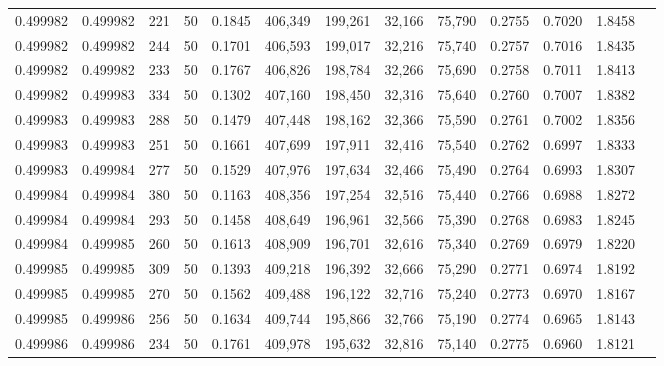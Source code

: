 \begin{tabular}{rrrrrrrrrrrrr}
0.499982 & 0.499982 &   221 &  50 &                                     0.1845 & 406,349 & 199,261 &  32,166 &  75,790 & 0.2755 & 0.7020 & 1.8458 \\
0.499982 & 0.499982 &   244 &  50 &                                     0.1701 & 406,593 & 199,017 &  32,216 &  75,740 & 0.2757 & 0.7016 & 1.8435 \\
0.499982 & 0.499982 &   233 &  50 &                                     0.1767 & 406,826 & 198,784 &  32,266 &  75,690 & 0.2758 & 0.7011 & 1.8413 \\
0.499982 & 0.499983 &   334 &  50 &                                     0.1302 & 407,160 & 198,450 &  32,316 &  75,640 & 0.2760 & 0.7007 & 1.8382 \\
0.499983 & 0.499983 &   288 &  50 &                                     0.1479 & 407,448 & 198,162 &  32,366 &  75,590 & 0.2761 & 0.7002 & 1.8356 \\
0.499983 & 0.499983 &   251 &  50 &                                     0.1661 & 407,699 & 197,911 &  32,416 &  75,540 & 0.2762 & 0.6997 & 1.8333 \\
0.499983 & 0.499984 &   277 &  50 &                                     0.1529 & 407,976 & 197,634 &  32,466 &  75,490 & 0.2764 & 0.6993 & 1.8307 \\
0.499984 & 0.499984 &   380 &  50 &                                     0.1163 & 408,356 & 197,254 &  32,516 &  75,440 & 0.2766 & 0.6988 & 1.8272 \\
0.499984 & 0.499984 &   293 &  50 &                                     0.1458 & 408,649 & 196,961 &  32,566 &  75,390 & 0.2768 & 0.6983 & 1.8245 \\
0.499984 & 0.499985 &   260 &  50 &                                     0.1613 & 408,909 & 196,701 &  32,616 &  75,340 & 0.2769 & 0.6979 & 1.8220 \\
0.499985 & 0.499985 &   309 &  50 &                                     0.1393 & 409,218 & 196,392 &  32,666 &  75,290 & 0.2771 & 0.6974 & 1.8192 \\
0.499985 & 0.499985 &   270 &  50 &                                     0.1562 & 409,488 & 196,122 &  32,716 &  75,240 & 0.2773 & 0.6970 & 1.8167 \\
0.499985 & 0.499986 &   256 &  50 &                                     0.1634 & 409,744 & 195,866 &  32,766 &  75,190 & 0.2774 & 0.6965 & 1.8143 \\
0.499986 & 0.499986 &   234 &  50 &                                     0.1761 & 409,978 & 195,632 &  32,816 &  75,140 & 0.2775 & 0.6960 & 1.8121 \\

\end{tabular}
